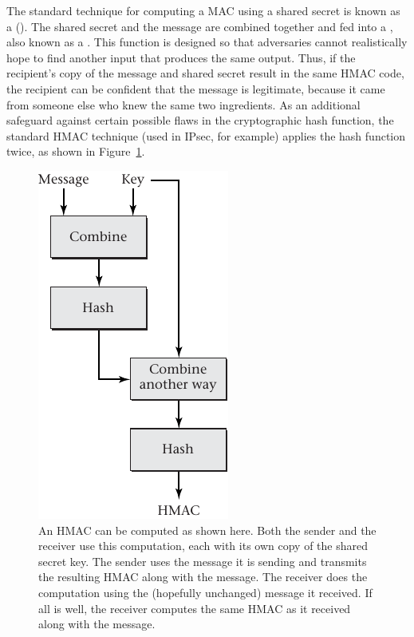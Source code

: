 The standard technique for computing a MAC using a shared secret is
known as a 
().  The shared secret and the message are combined together
and fed into a , also known as
a .  This function is designed so that
adversaries cannot realistically hope to find another input that
produces the same output.  Thus, if the recipient's copy of the
message and shared secret result in the same HMAC code, the recipient
can be confident that the message is legitimate, because it came from
someone else who knew the same two ingredients.  As an additional
safeguard against certain possible flaws in the cryptographic hash
function, the standard HMAC technique (used in IPsec, for example)
applies the hash function twice, as shown in
Figure~\ref{scan-9-10}.
\begin{figure}
\centerline{\includegraphics{hail_f0912}}
\caption{An HMAC can be computed as shown here.  Both the sender and
  the receiver use this computation, each with its own copy of the
  shared secret
  key.  The sender uses the message it is sending and transmits the
  resulting HMAC along with the message.  The
  receiver does the computation using the (hopefully unchanged) message it received.  If all
  is well, the receiver computes the same HMAC as it received along with
  the message.}
\label{scan-9-10}
\end{figure}

